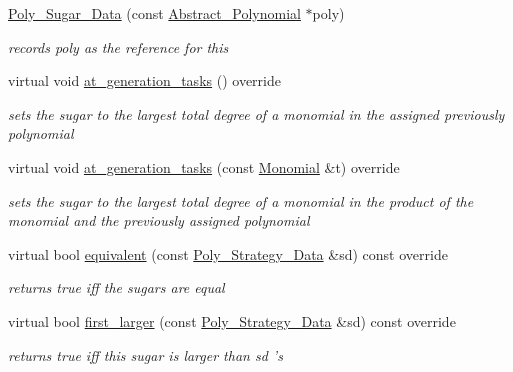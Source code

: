 \begin{DoxyCompactItemize}
\item 
\hyperlink{group__strategygroup_a0d9e2f66a44f2e10d26b977c55650f7f}{Poly\+\_\+\+Sugar\+\_\+\+Data} (const \hyperlink{group__polygroup_class_abstract___polynomial}{Abstract\+\_\+\+Polynomial} $\ast$poly)
\begin{DoxyCompactList}\small\item\em records {\ttfamily poly} as the reference for {\ttfamily this} \end{DoxyCompactList}\item 
\mbox{\label{group__strategygroup_a527b105db3edecb8ccfb3f46bbfafe15}} 
virtual void \hyperlink{group__strategygroup_a527b105db3edecb8ccfb3f46bbfafe15}{at\+\_\+generation\+\_\+tasks} () override
\begin{DoxyCompactList}\small\item\em sets the sugar to the largest total degree of a monomial in the assigned previously polynomial \end{DoxyCompactList}\item 
virtual void \hyperlink{group__strategygroup_a26a462d2dffa89942b82eeecf759bafa}{at\+\_\+generation\+\_\+tasks} (const \hyperlink{group__polygroup_class_monomial}{Monomial} \&t) override
\begin{DoxyCompactList}\small\item\em sets the sugar to the largest total degree of a monomial in the product of the monomial and the previously assigned polynomial \end{DoxyCompactList}\item 
virtual bool \hyperlink{group__strategygroup_afd535711760db4abd9851429184ac94c}{equivalent} (const \hyperlink{group__strategygroup_class_poly___strategy___data}{Poly\+\_\+\+Strategy\+\_\+\+Data} \&sd) const override
\begin{DoxyCompactList}\small\item\em returns {\ttfamily true} iff the sugars are equal \end{DoxyCompactList}\item 
virtual bool \hyperlink{group__strategygroup_a3473aac2bafb690a52670aa226fb47b2}{first\+\_\+larger} (const \hyperlink{group__strategygroup_class_poly___strategy___data}{Poly\+\_\+\+Strategy\+\_\+\+Data} \&sd) const override
\begin{DoxyCompactList}\small\item\em returns {\ttfamily true} iff {\ttfamily this} sugar is larger than {\ttfamily sd} 's \end{DoxyCompactList}\item 

\end{DoxyCompactItemize}
